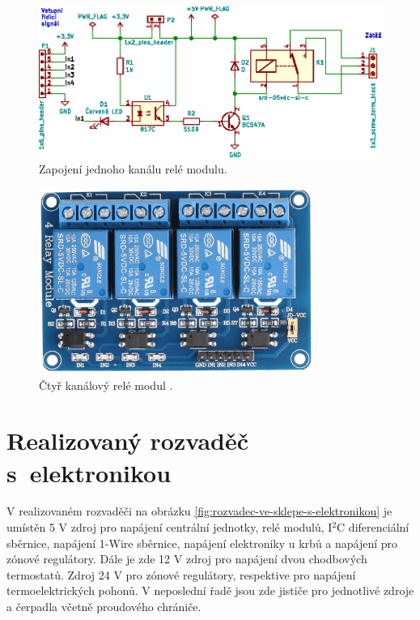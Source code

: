 \begin{figure}[H]
    \centering
    \includegraphics[width=\textwidth]{images/svg/kicad/rele-modul-jeden-kanal.eps}
    \caption{Zapojení jednoho kanálu relé modulu.}
    \label{fig:rele-modul-jeden-kanal}
\end{figure}


\begin{figure}[H]
    \centering
    \includegraphics[width=0.8\textwidth]{images/ctyr-kanalovy-rele-modul.png}
    \caption[Čtyř kanálový relé modul.]{Čtyř kanálový relé modul \cite{ctyr-kanalovy-rele-modul}.}
    \label{fig:ctyr-kanalovy-rele-modul}
\end{figure}

\section{Realizovaný rozvaděč s~elektronikou}

V realizovaném rozvaděči na obrázku \ref{fig:rozvadec-ve-sklepe-s-elektronikou} je umístěn 5 V zdroj pro napájení centrální jednotky, relé modulů, I$^2$C diferenciální sběrnice, napájení 1-Wire sběrnice, napájení elektroniky u krbů a napájení pro zónové regulátory. Dále je zde 12 V zdroj pro napájení dvou chodbových termostatů. Zdroj 24 V pro zónové regulátory, respektive pro napájení termoelektrických pohonů. V  neposlední řadě jsou zde jističe pro jednotlivé zdroje a čerpadla včetně proudového chrániče.

